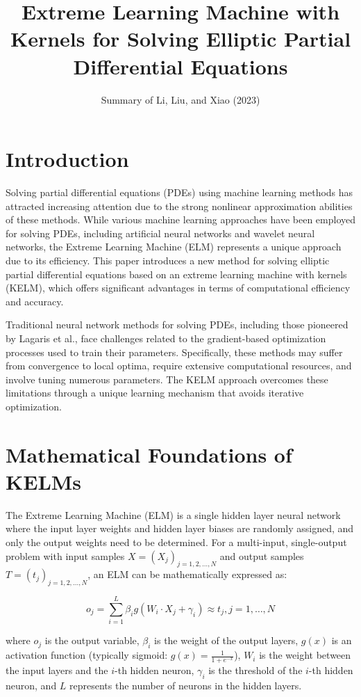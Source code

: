 \documentclass[11pt,a4paper]{article}
\title{Extreme Learning Machine with Kernels for Solving Elliptic Partial Differential Equations}
\author{Summary of Li, Liu, and Xiao (2023)}
\date{}
\begin{document}
\maketitle

\section{Introduction}
Solving partial differential equations (PDEs) using machine learning methods has attracted increasing attention due to the strong nonlinear approximation abilities of these methods. While various machine learning approaches have been employed for solving PDEs, including artificial neural networks and wavelet neural networks, the Extreme Learning Machine (ELM) represents a unique approach due to its efficiency. This paper introduces a new method for solving elliptic partial differential equations based on an extreme learning machine with kernels (KELM), which offers significant advantages in terms of computational efficiency and accuracy.

Traditional neural network methods for solving PDEs, including those pioneered by Lagaris et al., face challenges related to the gradient-based optimization processes used to train their parameters. Specifically, these methods may suffer from convergence to local optima, require extensive computational resources, and involve tuning numerous parameters. The KELM approach overcomes these limitations through a unique learning mechanism that avoids iterative optimization.

\section{Mathematical Foundations of KELMs}

The Extreme Learning Machine (ELM) is a single hidden layer neural network where the input layer weights and hidden layer biases are randomly assigned, and only the output weights need to be determined. For a multi-input, single-output problem with input samples $X=(X_j)_{j=1,2,\ldots,N}$ and output samples $T=(t_j)_{j=1,2,\ldots,N}$, an ELM can be mathematically expressed as:

\begin{equation}
o_j = \sum_{i=1}^{L} \beta_i g(W_i \cdot X_j + \gamma_i) \approx t_j, j=1,\ldots,N
\end{equation}

where $o_j$ is the output variable, $\beta_i$ is the weight of the output layers, $g(x)$ is an activation function (typically sigmoid: $g(x) = \frac{1}{1+e^{-x}}$), $W_i$ is the weight between the input layers and the $i$-th hidden neuron, $\gamma_i$ is the threshold of the $i$-th hidden neuron, and $L$ represents the number of neurons in the hidden layers.
\end{document}
